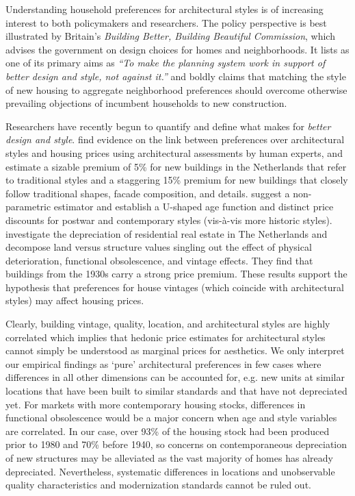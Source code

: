 \documentclass[]{article}
\begin{document}
Understanding household preferences for architectural styles is of increasing interest to both policymakers and researchers. The policy perspective is best illustrated by Britain's \emph{Building Better, Building Beautiful Commission}, which advises the government on design choices for homes and neighborhoods. It lists as one of its primary aims as \emph{``To make the planning system work in support of better design and style, not against it.''} \autocite{economistlineofbeauty2018} and boldly claims that matching the style of new housing to aggregate neighborhood preferences should overcome otherwise prevailing objections of incumbent households to new construction.

Researchers have recently begun to quantify and define what makes for \emph{better design and style}. \textcite{Buitelaar2017} find evidence on the link between preferences over architectural styles and housing prices using architectural assessments by human experts, and estimate a sizable premium of 5\% for new buildings in the Netherlands that refer to traditional styles and a staggering 15\% premium for new buildings that closely follow traditional shapes, facade composition, and details. \textcite{Coulson2008} suggest a non-parametric estimator and establish a U-shaped age function and distinct price discounts for postwar and contemporary styles (vis-à-vis more historic styles). \textcite{Francke2017a} investigate the depreciation of residential real estate in The Netherlands and decompose land versus structure values singling out the effect of physical deterioration, functional obsolescence, and vintage effects. They find that buildings from the 1930s carry a strong price premium. These results support the hypothesis that preferences for house vintages (which coincide with architectural styles) may affect housing prices.

Clearly, building vintage, quality, location, and architectural styles are highly correlated which implies that hedonic price estimates for architectural styles cannot simply be understood as marginal prices for aesthetics. We only interpret our empirical findings as `pure' architectural preferences in few cases where differences in all other dimensions can be accounted for, e.g. new units at similar locations that have been built to similar standards and that have not depreciated yet. For markets with more contemporary housing stocks, differences in functional obsolescence would be a major concern when age and style variables are correlated. In our case, over 93\% of the housing stock had been produced prior to 1980 and 70\% before 1940,  so concerns on contemporaneous depreciation of new structures may be alleviated as the vast majority of homes has already depreciated. Nevertheless, systematic differences in locations and unobservable quality characteristics and modernization standards cannot be ruled out.
\end{document}
